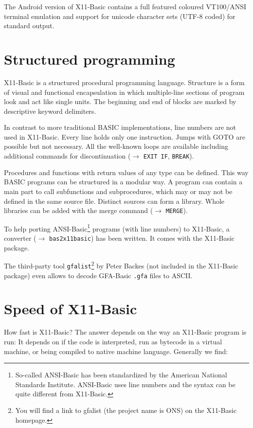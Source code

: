 The Android version of X11-Basic contains a full featured coloured 
VT100/ANSI terminal emulation and support for unicode character sets 
(UTF-8 coded) for standard output.


\section*{Structured programming}

X11-Basic is a structured procedural programming language.  Structure is a form
of visual and functional encapsulation in which multiple-line sections of
program look and act like single units. The beginning and end of blocks are
marked by descriptive keyword delimiters.

In contrast to more traditional BASIC implementations, line  numbers are not
used in X11-Basic. Every line holds only one instruction. Jumps with GOTO are
possible but not necessary. All the well-known loops are available including 
additional commands for discontinuation ($\longrightarrow$ \verb|EXIT IF|, \verb|BREAK|). 

Procedures and functions with return values of any type can be defined. This way
BASIC  programs can be structured in a modular way. A program can contain a main
part to call subfunctions and subprocedures, which may or may not be defined in
the same source file. Distinct sources can form a library. Whole libraries can
be added with the merge command ($\longrightarrow$ \verb|MERGE|).

To help porting ANSI-Basic\footnote{So-called ANSI-Basic has been standardized
by the American National Standards Institute. ANSI-Basic uses line numbers and
the syntax can be quite different from X11-Basic.} programs (with line numbers)
to X11-Basic, a converter ($\longrightarrow$ \verb|bas2x11basic|) has been written. It comes
with the X11-Basic package. 

The third-party tool \verb|gfalist|\footnote{You will find a link to gfalist 
(the project name is ONS) on the X11-Basic homepage.} by Peter Backes (not
included in the X11-Basic package) even allows to decode GFA-Basic \verb|.gfa|
files to ASCII.

\section*{Speed of X11-Basic}

How fast is X11-Basic? The answer depends on the way an X11-Basic program is
run: It depends on if the code is interpreted, run as bytecode in a virtual
machine, or being compiled to native machine language. Generally we find:

